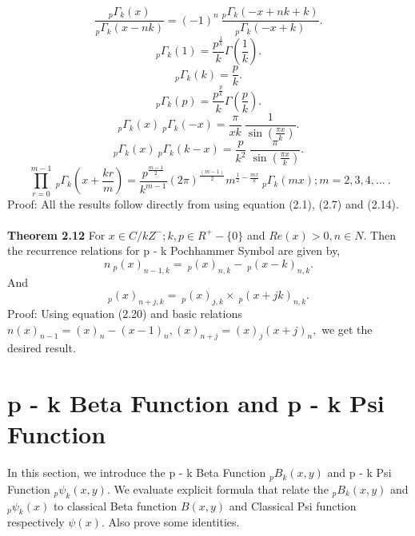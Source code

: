 \documentclass[11pt,a4paper]{article}
\numberwithin{equation}{section}
\begin{document}
\begin{equation}
\frac{_{p}\Gamma_{k}(x)}{_{p}\Gamma_{k}(x-nk)}=(-1)^{n}\:\frac{_{p}\Gamma_{k}(-x+nk+k)}{_{p}\Gamma_{k}(-x+k)}.
\end{equation}
\begin{equation}
_{p}\Gamma_{k}(1)=\frac{p^{\frac{1}{k}}}{k}\Gamma(\frac{1}{k}).
\end{equation}
\begin{equation}
_{p}\Gamma_{k}(k)=\frac{p}{k}.
\end{equation}
\begin{equation}
_{p}\Gamma_{k}(p)=\frac{p^{\frac{p}{k}}}{k}\Gamma(\frac{p}{k}).
\end{equation}
\begin{equation}
_{p}\Gamma_{k}(x)\:_{p}\Gamma_{k}(-x)=\frac{\pi}{xk}\:\frac{1}{\sin (\frac{\pi x}{k})}.
\end{equation}
\begin{equation}
_{p}\Gamma_{k}(x)\:_{p}\Gamma_{k}(k-x)=\frac{p}{k^{2}}\:\frac{\pi}{\sin (\frac{\pi x}{k}) }.
\end{equation}
\begin{equation}
\:\prod_{r=0}^{m-1}\:_{p}\Gamma_{k}(x+\frac{kr}{m})=\frac{p^{\frac{m-1}{2}}}{k^{m-1}}(2 \pi )^{\frac{(m-1)}{2}}m^{\frac{1}{2}-\frac{mx}{k}}\:_{p}\Gamma_{k}(mx); m=2,3,4,... \: .
\end{equation}
Proof: All the results follow directly from using equation (2.1), (2.7) and (2.14). \\\\
\textbf{Theorem 2.12} For $ x\in C/kZ^{-} ;  k,p \in R^{+}-\lbrace 0 \rbrace $ and $ Re(x)>0, n\in N. $
Then the recurrence relations for p - k Pochhammer Symbol are given by,
\begin{equation}
n\:_{p}(x)_{n-1,k}=\:_{p}(x)_{n,k}- \:_{p}(x-k)_{n,k}.
\end{equation}
And
\begin{equation}
_{p}(x)_{n+j,k}=\:_{p}(x)_{j,k}\times\:_{p}(x+jk)_{n,k}.
\end{equation}
Proof: Using equation (2.20) and basic relations $ n(x)_{n-1}=(x)_{n}-(x-1)_{n}, (x)_{n+j}=(x)_{j}(x+j)_{n},$ we get the desired result.  
\section{p - k Beta Function and p - k Psi Function}
In this section, we introduce the p - k Beta Function $ _{p}B_{k}(x,y) $ and p - k Psi Function $ _{p}\psi_{k}(x,y). $ We evaluate explicit formula that relate the $ _{p}B_{k}(x,y) $ and $ _{p}\psi_{k}(x) $ to classical Beta function $ B(x,y) $ and Classical Psi function respectively $ \psi(x). $ Also prove some identities.
\end{document}
